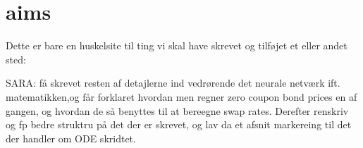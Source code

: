 \chapter{aims}
\label{chap:aims}
\Blindtext[2]

Dette er bare en huskelsite til ting vi skal have skrevet og tilføjet et eller andet sted:


SARA: få skrevet resten af detajlerne ind vedrørende det neurale netværk ift. matematikken,og får forklaret hvordan men regner zero coupon bond prices en af gangen, og hvordan de så benyttes til at bereegne swap rates. Derefter renskriv og fp bedre struktru på det der er skrevet, og lav da et afsnit markereing til det der handler om ODE skridtet.